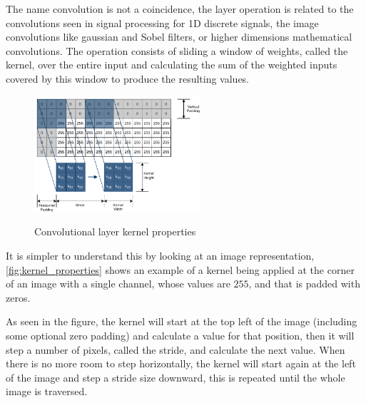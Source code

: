 The name convolution is not a coincidence, the layer operation is related to the convolutions seen in signal processing for 1D discrete signals, the image convolutions like gaussian and Sobel filters, or higher dimensions mathematical convolutions. The operation consists of sliding a window of weights, called the kernel, over the entire input and calculating the sum of the weighted inputs covered by this window to produce the resulting values.
\begin{figure}[hbt]
    \centering
    \caption{Convolutional layer kernel properties}
    \includegraphics[width=0.55\textwidth]{chapters/NeuralNets/figures/cnn.pdf}
    \label{fig:kernel_properties}
\end{figure}

It is simpler to understand this by looking at an image representation, \autoref{fig:kernel_properties} shows an example of a kernel being applied at the corner of an image with a single channel, whose values are $255$, and that is padded with zeros.

As seen in the figure, the kernel will start at the top left of the image (including some optional zero padding) and calculate a value for that position, then it will step a number of pixels, called the stride, and calculate the next value. When there is no more room to step horizontally, the kernel will start again at the left of the image and step a stride size downward, this is repeated until the whole image is traversed.

